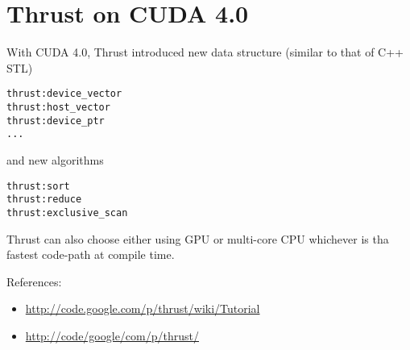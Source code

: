 \section{Thrust on CUDA 4.0}
\label{sec:thrust_cuda40}

With CUDA 4.0, Thrust introduced new data structure (similar to that of C++
STL)
\begin{lstlisting}
thrust:device_vector
thrust:host_vector
thrust:device_ptr  
...
\end{lstlisting}
and new algorithms
\begin{lstlisting}
thrust:sort
thrust:reduce
thrust:exclusive_scan  
\end{lstlisting}

Thrust can also choose either using GPU or multi-core CPU whichever is tha
fastest code-path at compile time. 



References:
\begin{itemize}
\item \url{http://code.google.com/p/thrust/wiki/Tutorial}
\item \url{http://code/google/com/p/thrust/}
\end{itemize}



